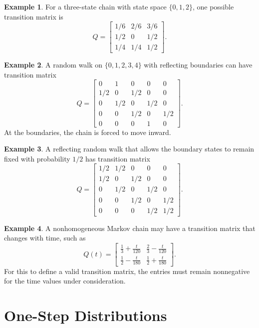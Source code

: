 \documentclass[12pt,oneside]{book}
\numberwithin{equation}{section}
\theoremstyle{definition}
\newtheorem{example}{Example}[section]
\theoremstyle{plain}
\theoremstyle{remark}
\begin{document}
\begin{example}
For a three-state chain with state space $\{0,1,2\}$, one possible transition matrix is
\[
Q=
\begin{bmatrix}
1/6 & 2/6 & 3/6\\
1/2 & 0 & 1/2\\
1/4 & 1/4 & 1/2
\end{bmatrix}.
\]
\end{example}

\begin{example}
A random walk on $\{0,1,2,3,4\}$ with reflecting boundaries can have transition matrix
\[
Q=
\begin{bmatrix}
0 & 1 & 0 & 0 & 0\\
1/2 & 0 & 1/2 & 0 & 0\\
0 & 1/2 & 0 & 1/2 & 0\\
0 & 0 & 1/2 & 0 & 1/2\\
0 & 0 & 0 & 1 & 0
\end{bmatrix}.
\]
At the boundaries, the chain is forced to move inward.
\end{example}

\begin{example}
A reflecting random walk that allows the boundary states to remain fixed with probability $1/2$ has transition matrix
\[
Q=
\begin{bmatrix}
1/2 & 1/2 & 0 & 0 & 0\\
1/2 & 0 & 1/2 & 0 & 0\\
0 & 1/2 & 0 & 1/2 & 0\\
0 & 0 & 1/2 & 0 & 1/2\\
0 & 0 & 0 & 1/2 & 1/2
\end{bmatrix}.
\]
\end{example}

\begin{example}
A nonhomogeneous Markov chain may have a transition matrix that changes with time, such as
\[
Q(t)=
\begin{bmatrix}
\frac{1}{3}+\frac{t}{120} & \frac{2}{3}-\frac{t}{120}\\
\frac{1}{2}-\frac{t}{180} & \frac{1}{2}+\frac{t}{180}
\end{bmatrix}.
\]
For this to define a valid transition matrix, the entries must remain nonnegative for the time values under consideration.
\end{example}

\section{One-Step Distributions}
\end{document}
